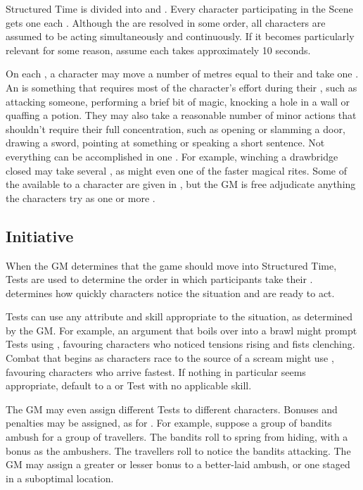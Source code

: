 Structured Time is divided into {\rounds} and {\turns}.
Every character participating in the Scene gets one {\turn} each {\round}.
Although the {\turns} are resolved in some order, all characters are assumed to be acting simultaneously and continuously.
If it becomes particularly relevant for some reason, assume each {\round} takes approximately 10 seconds.

On each {\turn}, a character may move a number of metres equal to their  and take one {\action}.
An {\action} is something that requires most of the character's effort during their {\turn}, such as attacking someone, performing a brief bit of magic, knocking a hole in a wall or quaffing a potion.
They may also take a reasonable number of minor actions that shouldn't require their full concentration, such as opening or slamming a door, drawing a sword, pointing at something or speaking a short sentence.
Not everything can be accomplished in one {\action}.
For example, winching a drawbridge closed may take several {\actions}, as might even one of the faster magical rites.
Some of the {\actions} available to a character are given in , but the GM is free adjudicate anything the characters try as one or more {\actions}.

\subsection{Initiative}

When the GM determines that the game should move into Structured Time, {\initiative} Tests are used to determine the order in which participants take their {\turns}.
{\initiative} determines how quickly characters notice the situation and are ready to act.

{\initiative} Tests can use any attribute and skill appropriate to the situation, as determined by the GM.
For example, an argument that boils over into a brawl might prompt {\initiative} Tests using , favouring characters who noticed tensions rising and fists clenching.
Combat that begins as characters race to the source of a scream might use , favouring characters who arrive fastest.
If nothing in particular seems appropriate, default to a  or  Test with no applicable skill.

The GM may even assign different Tests to different characters.
Bonuses and penalties may be assigned, as for {\opposedtests}.
For example, suppose a group of bandits ambush for a group of travellers.
The bandits roll  to spring from hiding, with a  bonus as the ambushers.
The travellers roll  to notice the bandits attacking.
The GM may assign a greater or lesser bonus to a better-laid ambush, or one staged in a suboptimal location.

